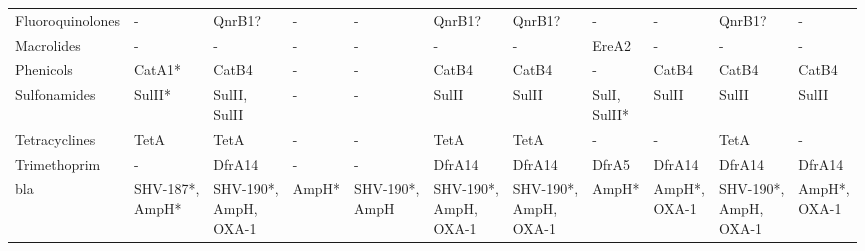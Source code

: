 \begin{sidewaystable}[ht]
\begin{threeparttable}
\begin{tabularx}{\textwidth}{lllllllllll}
              Fluoroquinolones &                      - &                           QnrB1? &                 - &                        - &                          QnrB1? &                         QnrB1? &                                - &                       - &                           QnrB1? &                       - \\
                    Macrolides &                      - &                                - &                 - &                        - &                               - &                              - &                            EreA2 &                       - &                                - &                       - \\
                     Phenicols &                 CatA1* &                            CatB4 &                 - &                        - &                           CatB4 &                          CatB4 &                                - &                   CatB4 &                            CatB4 &                   CatB4 \\
                  Sulfonamides &                 SulII* &              \mCL{SulII,\\SulII} &                 - &                        - &                           SulII &                          SulII &              \mCL{SulI,\\SulII*} &                   SulII &                            SulII &                   SulII \\
                 Tetracyclines &                   TetA &                             TetA &                 - &                        - &                            TetA &                           TetA &                                - &                       - &                             TetA &                       - \\
                  Trimethoprim &                      - &                           DfrA14 &                 - &                        - &                          DfrA14 &                         DfrA14 &                            DfrA5 &                  DfrA14 &                           DfrA14 &                  DfrA14 \\
                     \gls{bla} & \mCL{SHV-187*,\\AmpH*} &    \mCL{SHV-190*,\\AmpH,\\OXA-1} &             AmpH* &    \mCL{SHV-190*,\\AmpH} &   \mCL{SHV-190*,\\AmpH,\\OXA-1} &  \mCL{SHV-190*,\\AmpH,\\OXA-1} &                            AmpH* &     \mCL{AmpH*,\\OXA-1} &    \mCL{SHV-190*,\\AmpH,\\OXA-1} &     \mCL{AmpH*,\\OXA-1} \\

\end{tabularx}
\end{threeparttable}
\end{sidewaystable}
